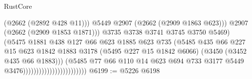 \begin{lexlean}{RustCore}
\begin{coremodule}
                                                        (@2662 (@2892 @428 @11)))
                                                      @5449
                                                      @2907
                                                      (@2662 (@2909 @1863 @623)))
                                                    @2907
                                                    (@2662 (@2909 @1853 @1871)))
                                                  @3735
                                                  @3738
                                                  @3741
                                                  @3745
                                                  @3750
                                                  @5469)
                                                (@5475
                                                  @1881
                                                  @438
                                                  @127
                                                  @66
                                                  @623
                                                  @1885
                                                  @623
                                                  @735
                                                  (@5485
                                                    @435
                                                    @66
                                                    @227
                                                    @15
                                                    @623
                                                    @1842
                                                    @1883
                                                    @3178
                                                    (@5495 @227 @15 @1842 @6066)
                                                    (@3450 (@3452 @435 @66 @1883)))
                                                  (@5485
                                                    @77
                                                    @66
                                                    @110
                                                    @14
                                                    @623
                                                    @694
                                                    @733
                                                    @3177
                                                    @5449
                                                    @3476))))))))))))))))))))))))
@6199 := @5226 @6198

\end{coremodule}
\end{lexlean}
